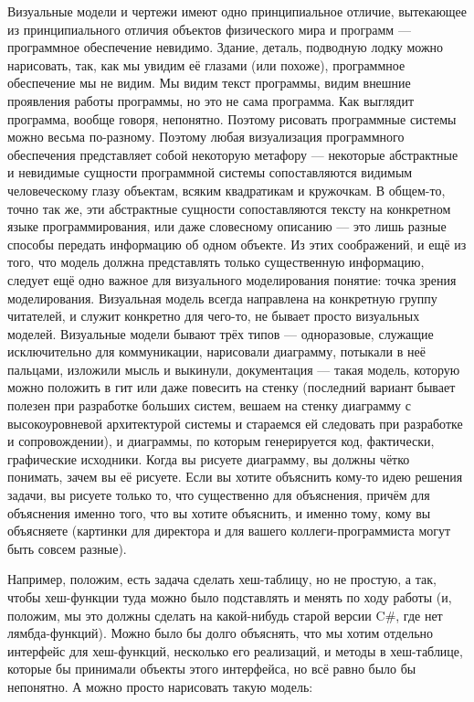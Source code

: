 \documentclass[a5paper]{article}
\begin{document}
Визуальные модели и чертежи имеют одно принципиальное отличие, вытекающее из принципиального отличия объектов физического мира и программ --- программное обеспечение невидимо. Здание, деталь, подводную лодку можно нарисовать, так, как мы увидим её глазами (или похоже), программное обеспечение мы не видим. Мы видим текст программы, видим внешние проявления работы программы, но это не сама программа. Как выглядит программа, вообще говоря, непонятно. Поэтому рисовать программные системы можно весьма по-разному. Поэтому любая визуализация программного обеспечения представляет собой некоторую метафору --- некоторые абстрактные и невидимые сущности программной системы сопоставляются видимым человеческому глазу объектам, всяким квадратикам и кружочкам. В общем-то, точно так же, эти абстрактные сущности сопоставляются тексту на конкретном языке программирования, или даже словесному описанию --- это лишь разные способы передать информацию об одном объекте. Из этих соображений, и ещё из того, что модель должна представлять только существенную информацию, следует ещё одно важное для визуального моделирования понятие: точка зрения моделирования. Визуальная модель всегда направлена на конкретную группу читателей, и служит конкретно для чего-то, не бывает просто визуальных моделей. Визуальные модели бывают трёх типов --- одноразовые, служащие исключительно для коммуникации, нарисовали диаграмму, потыкали в неё пальцами, изложили мысль и выкинули, документация --- такая модель, которую можно положить в гит или даже повесить на стенку (последний вариант бывает полезен при разработке больших систем, вешаем на стенку диаграмму с высокоуровневой архитектурой системы и стараемся ей следовать при разработке и сопровождении), и диаграммы, по которым генерируется код, фактически, графические исходники. Когда вы рисуете диаграмму, вы должны чётко понимать, зачем вы её рисуете. Если вы хотите объяснить кому-то идею решения задачи, вы рисуете только то, что существенно для объяснения, причём для объяснения именно того, что вы хотите объяснить, и именно тому, кому вы объясняете (картинки для директора и для вашего коллеги-программиста могут быть совсем разные).

Например, положим, есть задача сделать хеш-таблицу, но не простую, а так, чтобы хеш-функции туда можно было подставлять и менять по ходу работы (и, положим, мы это должны сделать на какой-нибудь старой версии C\#, где нет лямбда-функций). Можно было бы долго объяснять, что мы хотим отдельно интерфейс для хеш-функций, несколько его реализаций, и методы в хеш-таблице, которые бы принимали объекты этого интерфейса, но всё равно было бы непонятно. А можно просто нарисовать такую модель:
\end{document}
